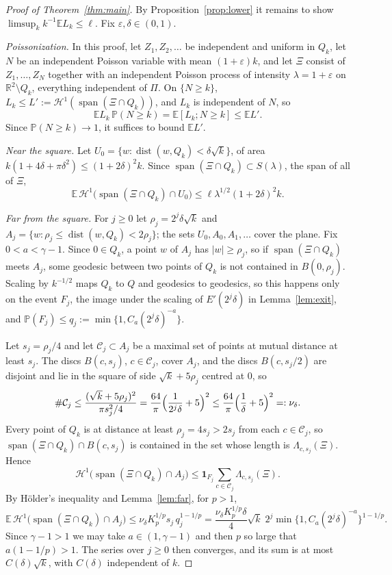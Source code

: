 \documentclass[11pt]{amsart}
\theoremstyle{remark}
\newcommand{\R}{\mathbb{R}}
\newcommand{\E}{\mathbb{E}}
\newcommand{\Prob}{\mathbb{P}}
\newcommand{\Hone}{\mathcal{H}^1}
\newcommand{\spn}{\operatorname{span}}
\begin{document}
\begin{proof}[Proof of Theorem~\ref{thm:main}]
By Proposition~\ref{prop:lower} it remains to show $\limsup_kk^{-1}\E L_k\le\ell$. Fix $\varepsilon,\delta\in(0,1)$.

\emph{Poissonization.} In this proof, let $Z_1,Z_2,\dots$ be independent and uniform in $Q_k$, let $N$ be an independent Poisson
variable with mean $(1+\varepsilon)k$, and let $\Xi$ consist of $Z_1,\dots,Z_N$ together with an independent Poisson
process of intensity $\lambda=1+\varepsilon$ on $\R^2\setminus Q_k$, everything independent of $\Pi$. On $\{N\ge k\}$,
$L_k\le L':=\Hone(\spn(\Xi\cap Q_k))$, and $L_k$ is independent of $N$, so
\[
\E L_k\,\Prob(N\ge k)=\E[L_k;N\ge k]\le\E L'.
\]
Since $\Prob(N\ge k)\to1$, it suffices to bound $\E L'$.

\emph{Near the square.} Let $U_0=\{w:\operatorname{dist}(w,Q_k)<\delta\sqrt k\}$, of area $k(1+4\delta+\pi\delta^2)\le
(1+2\delta)^2k$. Since $\spn(\Xi\cap Q_k)\subset S(\lambda)$, the span of all of $\Xi$,
\[
\E\,\Hone\bigl(\spn(\Xi\cap Q_k)\cap U_0\bigr)\le\ell\lambda^{1/2}(1+2\delta)^2k .
\]

\emph{Far from the square.} For $j\ge0$ let $\rho_j=2^j\delta\sqrt k$ and $A_j=\{w:\rho_j\le\operatorname{dist}(w,Q_k)
<2\rho_j\}$; the sets $U_0,A_0,A_1,\dots$ cover the plane. Fix $0<a<\gamma-1$. Since $0\in Q_k$, a point $w$ of $A_j$
has $|w|\ge\rho_j$, so if $\spn(\Xi\cap Q_k)$ meets $A_j$, some geodesic between two points of $Q_k$ is not contained
in $B(0,\rho_j)$. Scaling by $k^{-1/2}$ maps $Q_k$ to $Q$ and geodesics to geodesics, so this happens only on the
event $F_j$, the image under the scaling of $E'(2^j\delta)$ in Lemma~\ref{lem:exit}, and
$\Prob(F_j)\le q_j:=\min\{1,C_a(2^j\delta)^{-a}\}$.

Let $s_j=\rho_j/4$ and let $\mathcal C_j\subset A_j$ be a maximal set of points at mutual distance at least $s_j$.
The discs $B(c,s_j)$, $c\in\mathcal C_j$, cover $A_j$, and the discs $B(c,s_j/2)$ are disjoint and lie in the square
of side $\sqrt k+5\rho_j$ centred at $0$, so
\[
\#\mathcal C_j\le\frac{(\sqrt k+5\rho_j)^2}{\pi s_j^2/4}=\frac{64}{\pi}\Bigl(\frac1{2^j\delta}+5\Bigr)^2\le
\frac{64}{\pi}\Bigl(\frac1\delta+5\Bigr)^2=:\nu_\delta .
\]
Every point of $Q_k$ is at distance at least $\rho_j=4s_j>2s_j$ from each $c\in\mathcal C_j$, so
$\spn(\Xi\cap Q_k)\cap B(c,s_j)$ is contained in the set whose length is $\Lambda_{c,s_j}(\Xi)$. Hence
\[
\Hone\bigl(\spn(\Xi\cap Q_k)\cap A_j\bigr)\le\mathbf 1_{F_j}\sum_{c\in\mathcal C_j}\Lambda_{c,s_j}(\Xi).
\]
By H\"older's inequality and Lemma~\ref{lem:far}, for $p>1$,
\[
\E\,\Hone\bigl(\spn(\Xi\cap Q_k)\cap A_j\bigr)\le \nu_\delta K_p^{1/p}s_j\,q_j^{1-1/p}
=\frac{\nu_\delta K_p^{1/p}\delta}{4}\sqrt k\;2^j\min\bigl\{1,C_a(2^j\delta)^{-a}\bigr\}^{1-1/p}.
\]
Since $\gamma-1>1$ we may take $a\in(1,\gamma-1)$ and then $p$ so large that $a(1-1/p)>1$. The series over $j\ge0$
then converges, and its sum is at most $C(\delta)\sqrt k$, with $C(\delta)$ independent of $k$.


\end{proof}
\end{document}
